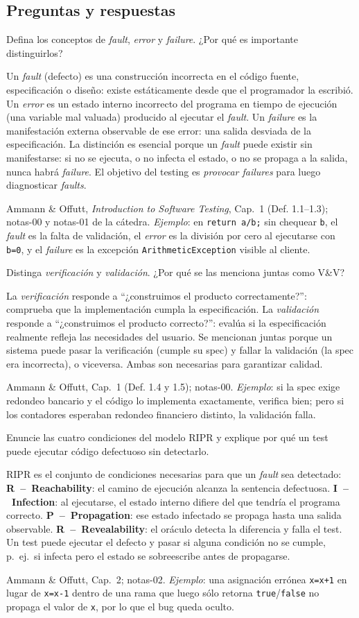 \documentclass[11pt,a4paper]{article}
\newcounter{preg}
\newcommand{\qa}[3]{%
  \stepcounter{preg}%
  \vspace{0.4em}
  \begin{preguntabox}{\thepreg}
  #1
  \end{preguntabox}
  \begin{respuestabox}
  #2
  \end{respuestabox}
  \begin{refbox}
  #3
  \end{refbox}
  \vspace{0.6em}
}
\begin{document}
\subsection*{Preguntas y respuestas}

\qa{Defina los conceptos de \emph{fault}, \emph{error} y \emph{failure}. ¿Por qué es importante distinguirlos?}
{Un \emph{fault} (defecto) es una construcción incorrecta en el código fuente, especificación o diseño: existe estáticamente desde que el programador la escribió. Un \emph{error} es un estado interno incorrecto del programa en tiempo de ejecución (una variable mal valuada) producido al ejecutar el \emph{fault}. Un \emph{failure} es la manifestación externa observable de ese error: una salida desviada de la especificación. La distinción es esencial porque un \emph{fault} puede existir sin manifestarse: si no se ejecuta, o no infecta el estado, o no se propaga a la salida, nunca habrá \emph{failure}. El objetivo del testing es \emph{provocar failures} para luego diagnosticar \emph{faults}.}
{Ammann \& Offutt, \emph{Introduction to Software Testing}, Cap.~1 (Def. 1.1--1.3); notas-00 y notas-01 de la cátedra. \emph{Ejemplo}: en \texttt{return a/b;} sin chequear \texttt{b}, el \emph{fault} es la falta de validación, el \emph{error} es la división por cero al ejecutarse con \texttt{b=0}, y el \emph{failure} es la excepción \texttt{ArithmeticException} visible al cliente.}

\qa{Distinga \emph{verificación} y \emph{validación}. ¿Por qué se las menciona juntas como V\&V?}
{La \emph{verificación} responde a ``¿construimos el producto correctamente?'': comprueba que la implementación cumpla la especificación. La \emph{validación} responde a ``¿construimos el producto correcto?'': evalúa si la especificación realmente refleja las necesidades del usuario. Se mencionan juntas porque un sistema puede pasar la verificación (cumple su spec) y fallar la validación (la spec era incorrecta), o viceversa. Ambas son necesarias para garantizar calidad.}
{Ammann \& Offutt, Cap.~1 (Def. 1.4 y 1.5); notas-00. \emph{Ejemplo}: si la spec exige redondeo bancario y el código lo implementa exactamente, verifica bien; pero si los contadores esperaban redondeo financiero distinto, la validación falla.}

\qa{Enuncie las cuatro condiciones del modelo RIPR y explique por qué un test puede ejecutar código defectuoso sin detectarlo.}
{RIPR es el conjunto de condiciones necesarias para que un \emph{fault} sea detectado: \textbf{R~--~Reachability}: el camino de ejecución alcanza la sentencia defectuosa. \textbf{I~--~Infection}: al ejecutarse, el estado interno difiere del que tendría el programa correcto. \textbf{P~--~Propagation}: ese estado infectado se propaga hasta una salida observable. \textbf{R~--~Revealability}: el oráculo detecta la diferencia y falla el test. Un test puede ejecutar el defecto y pasar si alguna condición no se cumple, p.~ej.\ si infecta pero el estado se sobreescribe antes de propagarse.}
{Ammann \& Offutt, Cap.~2; notas-02. \emph{Ejemplo}: una asignación errónea \texttt{x=x+1} en lugar de \texttt{x=x-1} dentro de una rama que luego sólo retorna \texttt{true}/\texttt{false} no propaga el valor de \texttt{x}, por lo que el bug queda oculto.}
\end{document}
